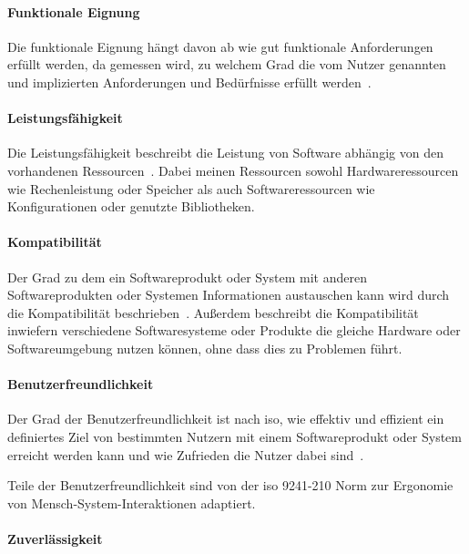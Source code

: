 \documentclass[12pt, a4paper, ngerman]{article}
\begin{document}
\paragraph{Funktionale Eignung}

Die funktionale Eignung hängt davon ab wie gut funktionale Anforderungen erfüllt werden,
da gemessen wird, zu welchem Grad die vom Nutzer genannten 
und implizierten Anforderungen und Bedürfnisse erfüllt werden~\cite{ISO25010}.

\paragraph{Leistungsfähigkeit}

Die Leistungsfähigkeit beschreibt die Leistung von Software 
abhängig von den vorhandenen Ressourcen~\cite{ISO25010}.
Dabei meinen Ressourcen sowohl Hardwareressourcen wie Rechenleistung oder Speicher
als auch Softwareressourcen wie Konfigurationen oder genutzte Bibliotheken.

\paragraph{Kompatibilität}

Der Grad zu dem ein Softwareprodukt oder System mit anderen Softwareprodukten oder Systemen Informationen
austauschen kann wird durch die Kompatibilität beschrieben~\cite{ISO25010}.
Außerdem beschreibt die Kompatibilität inwiefern verschiedene Softwaresysteme oder Produkte die gleiche Hardware
oder Softwareumgebung nutzen können, ohne dass dies zu Problemen führt.

\paragraph{Benutzerfreundlichkeit}

Der Grad der Benutzerfreundlichkeit ist nach \ac{iso},
wie effektiv und effizient ein definiertes Ziel von bestimmten Nutzern
mit einem Softwareprodukt oder System erreicht werden kann
und wie Zufrieden die Nutzer dabei sind~\cite{ISO25010}.

Teile der Benutzerfreundlichkeit sind von der \ac{iso} 9241-210 Norm
zur Ergonomie von Mensch-System-Interaktionen adaptiert.

\paragraph{Zuverlässigkeit}
\end{document}
